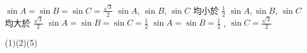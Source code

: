 \begin{QUESTIONS}
\begin{QUESTION}
\begin{QBODY}
            \begin{QOPS} 
                \QOP $\sin A=\sin B= \sin C= \frac{\sqrt{3}}{2}$ 
                \QOP $\sin A$, $\sin B$, $\sin C$ 均小於 $\frac{1}{2}$ 
                \QOP $\sin A, \sin B$, $\sin C$ 均大於 $\frac{\sqrt{3}}{2}$ 
                \QOP $\sin A = \sin B = \sin C =\frac{1}{2}$ 
                \QOP $\sin A= \sin B= \frac{1}{2}$ , $\sin C= \frac{\sqrt{3}}{2}$
            \end{QOPS}
        \end{QBODY}
        \begin{QFROMS}
        \end{QFROMS}
        \begin{QTAGS}\end{QTAGS}
        \begin{QANS}
            (1)(2)(5)
        \end{QANS}
        \begin{QSOLLIST}
        \end{QSOLLIST}
        \begin{QEMPTYSPACE}
        \end{QEMPTYSPACE}
    \end{QUESTION}
\end{QUESTIONS}

